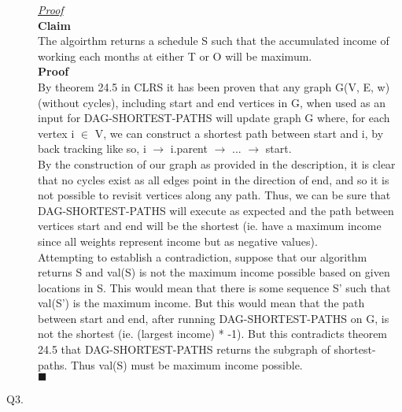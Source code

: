\documentclass[10pt]{csc_assignment}
\begin{document}
\begin{description}
\emph{\underline{Proof}}\\
\textbf{Claim}\\
The algoirthm returns a schedule S such that the accumulated income of working each months at either T or O will be maximum.\\
\textbf{Proof}\\
By theorem 24.5 in CLRS it has been proven that any graph G(V, E, w) (without cycles), including start and end vertices in G, when used as an input for DAG-SHORTEST-PATHS will update graph G where, for each vertex i $\in$ V, we can construct a shortest path between start and i, by back tracking like so, i $\rightarrow$ i.parent $\rightarrow$ ... $\rightarrow$ start.\\
By the construction of our graph as provided in the description, it is clear that no cycles exist as all edges point in the direction of end, and so it is not possible to revisit vertices along any path. Thus, we can be sure that DAG-SHORTEST-PATHS will execute as expected and the path between vertices start and end will be the shortest (ie. have a maximum income since all weights represent income but as negative values).\\
Attempting to establish a contradiction, suppose that our algorithm returns S and val(S) is not the maximum income possible based on given locations in S. This would mean that there is some sequence S' such that val(S') is the maximum income. But this would mean that the path between start and end, after running DAG-SHORTEST-PATHS on G, is not the shortest (ie. (largest income) * -1). But this contradicts theorem 24.5 that DAG-SHORTEST-PATHS returns the subgraph of shortest-paths. Thus val(S) must be maximum income possible.\\
$\blacksquare$\\


\newpage
\item[Q3.]


\end{description}
\end{document}
